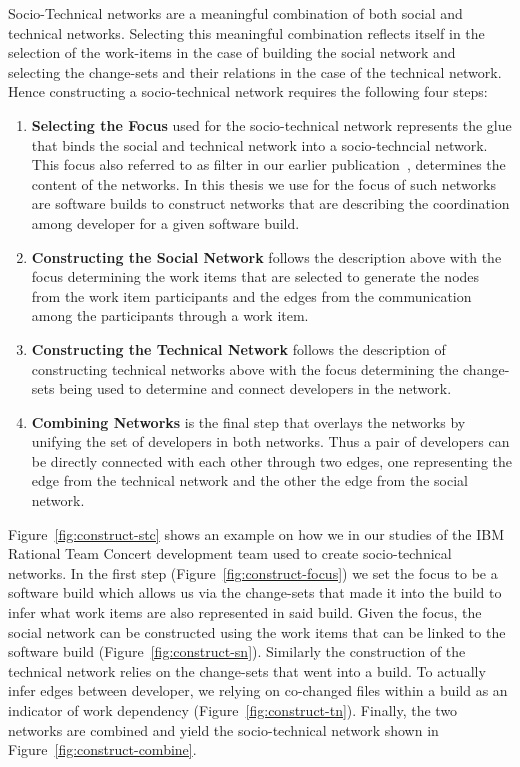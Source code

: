 Socio-Technical networks are a meaningful combination of both social and technical networks.
Selecting this meaningful combination reflects itself in the selection of the work-items in the case of building the social network and selecting the change-sets and their relations in the case of the technical network.
Hence constructing a socio-technical network requires the following four steps:

\begin{enumerate}
\item\textbf{Selecting the Focus} used for the socio-technical network represents the glue that binds the social and technical network into a socio-techncial network. 
This focus also referred to as filter in our earlier publication~\cite{wolf:ieee:2009}, determines the content of the networks.
In this thesis we use for the focus of such networks are software builds to construct networks that are describing the coordination among developer for a given software build.
\item\textbf{Constructing the Social Network} follows the description above with the focus determining the work items that are selected to generate the nodes from the work item participants and the edges from the communication among the participants through a work item.
\item\textbf{Constructing the Technical Network} follows the description of constructing technical networks above with the focus determining the change-sets being used to determine and connect developers in the network.
\item\textbf{Combining Networks} is the final step that overlays the networks by unifying the set of developers in both networks.
Thus a pair of developers can be directly connected with each other through two edges, one representing the edge from the technical network and the other the edge from the social network.
\end{enumerate}

Figure~\ref{fig:construct-stc} shows an example on how we in our studies of the IBM Rational Team Concert development team used to create socio-technical networks.
In the first step (Figure~\ref{fig:construct-focus}) we set the focus to be a software build which allows us via the change-sets that made it into the build to infer what work items are also represented in said build.
Given the focus, the social network can be constructed using the work items that can be linked to the software build (Figure~\ref{fig:construct-sn}).
Similarly the construction of the technical network relies on the change-sets that went into a build. 
To actually infer edges between developer, we relying on co-changed files within a build as an indicator of work dependency (Figure~\ref{fig:construct-tn}).
Finally, the two networks are combined and yield the socio-technical network shown in Figure~\ref{fig:construct-combine}.

